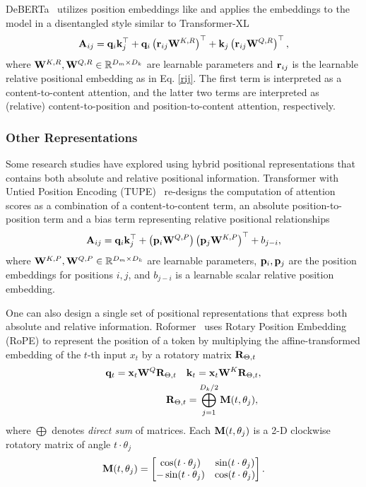 \documentclass[manuscript,acmsmall,screen,nonacm]{acmart}
\theoremstyle{definition}
\begin{document}
DeBERTa~\cite{he2020deberta} utilizes position embeddings like \citet{shaw2018relative} and applies the embeddings to the model in a disentangled style similar to Transformer-XL~\cite{dai2019transformerxl}
\begin{equation}
    \mathbf{A}_{ij}=\mathbf{q}_i \mathbf{k}_j^\top+\mathbf{q}_i\left(\mathbf{r}_{ij}\mathbf{W}^{K,R}\right)^\top +\mathbf{k}_j\left(\mathbf{r}_{ij}\mathbf{W}^{Q,R}\right)^\top,
\end{equation}
where $\mathbf{W}^{K,R},\mathbf{W}^{Q,R}\in\mathbb{R}^{D_m\times D_k}$ are learnable parameters and $\mathbf{r}_{ij}$ is the learnable relative positional embedding as in Eq. \eqref{rij}. The first term is interpreted as a content-to-content attention, and the latter two terms are interpreted as (relative) content-to-position and position-to-content attention, respectively.

\subsubsection{Other Representations}
Some research studies have explored using hybrid positional representations that contains both absolute and relative positional information. Transformer with Untied Position Encoding (TUPE)~\cite{ke2020tupe} re-designs the computation of attention scores as a combination of a content-to-content term, an absolute position-to-position term and a bias term representing relative positional relationships
\begin{equation}
    \mathbf{A}_{ij}=\mathbf{q}_i \mathbf{k}_j^\top+\left(\mathbf{p}_i\mathbf{W}^{Q,P}\right)\left(\mathbf{p}_{j}\mathbf{W}^{K,P}\right)^\top +b_{j-i},
\end{equation}
where $\mathbf{W}^{K,P},\mathbf{W}^{Q,P}\in\mathbb{R}^{D_m\times D_k}$ are learnable parameters, $\mathbf{p}_i, \mathbf{p}_j$ are the position embeddings for positions $i,j$, and $b_{j-i}$ is a learnable scalar relative position embedding.

One can also design a single set of positional representations that express both absolute and relative information. Roformer~\cite{su2021roformer} uses Rotary Position Embedding (RoPE) to represent the position of a token by multiplying the affine-transformed embedding of the $t$-th input $x_t$ by a rotatory matrix $\mathbf{R}_{\Theta,t}$
\begin{align}
    \mathbf{q}_t=\mathbf{x}_t\mathbf{W}^Q\mathbf{R}_{\Theta,t}\quad & \mathbf{k}_t=\mathbf{x}_t\mathbf{W}^K\mathbf{R}_{\Theta,t},\\
    \mathbf{R}_{\Theta,t}&=\bigoplus_{j=1}^{D_k/2} \mathbf{M}(t,\theta_j),
\end{align}
where $\bigoplus$ denotes \textit{direct sum} of matrices. Each $\mathbf{M}(t,\theta_j)$ is a 2-D clockwise rotatory matrix of angle $t\cdot \theta_j$
\begin{equation}
    \mathbf{M}(t,\theta_j)=\left[\begin{matrix} \cos(t\cdot \theta_j)&\sin(t\cdot \theta_j)\\
    -\sin(t\cdot \theta_j)&\cos(t\cdot \theta_j)\end{matrix}
    \right].
\end{equation}
\end{document}
